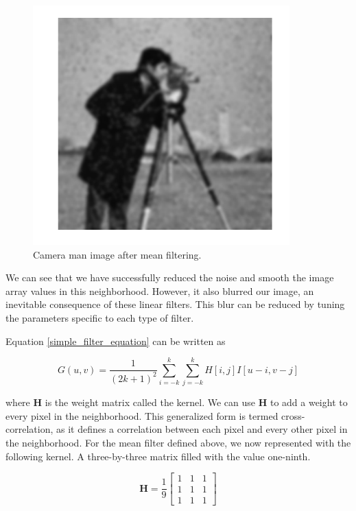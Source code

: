 \begin{figure}[!htb]
\begin{center}
\includegraphics[scale=0.380]{img/visual_perception/camera_man_3.jpeg}
\end{center}
\caption{Camera man image after mean filtering.}
\label{camera_man_3}
\end{figure}

We can see that we have successfully reduced the noise and smooth the image array values in this neighborhood. 
However, it also blurred our image, an inevitable consequence
of these linear filters. This blur can be reduced by tuning the parameters specific to each type of filter.

Equation \ref{simple_filter_equation} can be written as

\begin{equation}
G(u,v) = \frac{1}{(2k+1)^2} \sum_{i=-k}^{k}\sum_{j=-k}^{k} H[i,j]I[u-i, v-j]
\label{simple_filter_equation_2}
\end{equation}

where $\mathbf{H}$ is the weight matrix  called the kernel. We can use $\mathbf{H}$ to add a  weight to every pixel
in the neighborhood.  This generalized form is termed cross-correlation, as it defines a correlation between each pixel and every other pixel in
the neighborhood. For the mean filter defined above, we now represented with the following kernel. A three-by-three matrix filled with the value one-ninth. 

\begin{equation}
\mathbf{H} = \frac{1}{9}\begin{bmatrix}
1 & 1 & 1 \\
1 & 1 & 1 \\
1 & 1 & 1 
\end{bmatrix}
\end{equation}

